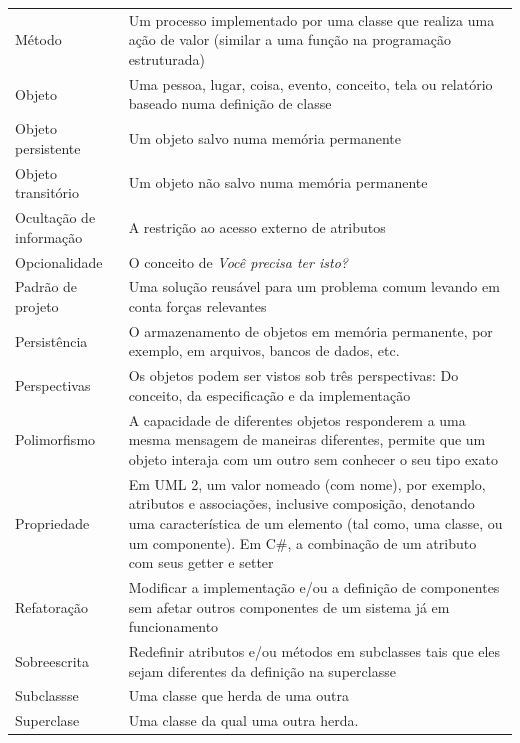 \begin{longtable}[l]{p{4.6cm}p{11.1cm}}
Método & Um processo implementado por uma classe que realiza uma ação de valor (similar a uma função na programação estruturada)\\

Objeto & Uma pessoa, lugar, coisa, evento, conceito, tela ou relatório baseado numa definição de classe\\

Objeto persistente & Um objeto salvo numa memória permanente\\

Objeto transitório & Um objeto não salvo numa memória permanente\\

Ocultação de informação & A restrição ao acesso externo de atributos\\

Opcionalidade & O conceito de \emph{Você precisa ter isto?}\\

Padrão de projeto & Uma solução reusável para um problema comum levando em conta forças relevantes\\

Persistência & O armazenamento de objetos em memória permanente, por exemplo, em arquivos, bancos de dados, etc.\\

Perspectivas & Os objetos podem ser vistos sob três perspectivas: Do conceito, da especificação e da implementação \\

Polimorfismo & A capacidade de diferentes objetos responderem a uma mesma mensagem de maneiras diferentes, permite que um objeto interaja com um outro sem conhecer o seu tipo exato\\

Propriedade & Em UML 2, um valor nomeado (com nome), por exemplo, atributos e associações, inclusive composição, denotando uma característica de um elemento (tal como, uma classe, ou um componente). Em C\#, a combinação de um atributo com seus getter e setter \\

Refatoração & Modificar a implementação e/ou a definição de componentes sem afetar outros componentes de um sistema já em funcionamento\\

Sobreescrita & Redefinir atributos e/ou métodos em subclasses tais que eles sejam diferentes da definição na superclasse\\

Subclassse & Uma classe que herda de uma outra\\

Superclase & Uma classe da qual uma outra herda.\\

\end{longtable}
 
